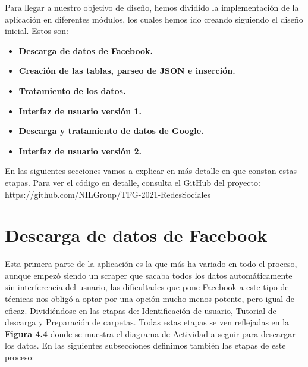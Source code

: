 Para llegar a nuestro objetivo de diseño, hemos dividido la implementación de la aplicación en diferentes módulos, los cuales hemos ido creando siguiendo el diseño inicial. Estos son:

\begin{itemize}
	\item \textbf{ Descarga de datos de Facebook.}
	\item \textbf{ Creación de las tablas, parseo de JSON e inserción.}
	\item \textbf{ Tratamiento de los datos.}
	\item \textbf{ Interfaz de usuario versión 1.}
	\item \textbf{ Descarga y tratamiento de datos de Google.}
	\item \textbf{ Interfaz de usuario versión 2.}
\end{itemize}

En las siguientes secciones  vamos a explicar en más detalle en que constan estas etapas. Para ver el código en detalle, consulta el GitHub del proyecto: 	https://github.com/NILGroup/TFG-2021-RedesSociales 


\section{Descarga de datos de Facebook}

Esta primera parte de la aplicación es la que más ha variado en todo el proceso, aunque empezó siendo un scraper que sacaba todos los datos automáticamente sin interferencia del usuario, las dificultades que pone Facebook a este tipo de técnicas nos obligó a optar por una opción mucho menos potente, pero igual de eficaz. Dividiéndose en las etapas de: Identificación de usuario, Tutorial de descarga y Preparación de carpetas. Todas estas etapas se ven reflejadas en la \textbf{Figura 4.4} donde se muestra el diagrama de Actividad a seguir para descargar los datos. En las siguientes subsecciones definimos también las etapas de este proceso:


